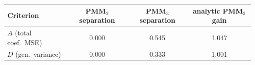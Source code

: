 \begin{tabular}{lccc}
\toprule
Criterion & PMM$_2$ separation & PMM$_3$ separation & analytic PMM$_3$ gain \\
\midrule
$A$ (total coef.\ MSE) & 0.000 & 0.545 & 1.047 \\
$D$ (gen.\ variance) & 0.000 & 0.333 & 1.001 \\
\bottomrule
\end{tabular}
